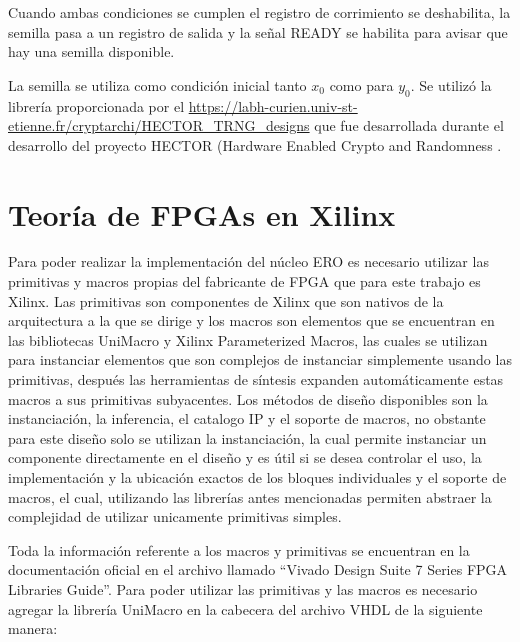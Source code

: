         Cuando ambas condiciones se cumplen el registro de corrimiento se deshabilita, la semilla pasa a un registro de salida y la señal READY se habilita para avisar que hay una semilla disponible.

        La semilla se utiliza como condición inicial tanto $x_{0}$ como para $y_{0}$. Se utilizó la librería proporcionada por el \url{https://labh-curien.univ-st-etienne.fr/cryptarchi/HECTOR_TRNG_designs} que fue desarrollada durante el desarrollo del proyecto HECTOR (Hardware Enabled Crypto and Randomness \cite{Laban2016}.

    \section{Teoría de FPGAs en Xilinx}
        Para poder realizar la implementación del núcleo ERO es necesario utilizar las primitivas y macros propias del fabricante de FPGA que para este trabajo es Xilinx. Las primitivas son componentes de Xilinx que son nativos de la arquitectura a la que se dirige y los macros son elementos que se encuentran en las bibliotecas UniMacro y Xilinx Parameterized Macros, las cuales se utilizan para instanciar elementos que son complejos de instanciar simplemente usando las primitivas, después las herramientas de síntesis expanden automáticamente estas macros a sus primitivas subyacentes. Los métodos de diseño disponibles son la instanciación, la inferencia, el catalogo IP y el soporte de macros, no obstante para este diseño solo se utilizan la instanciación, la cual permite instanciar un componente directamente en el diseño y es útil si se desea controlar el uso, la implementación y la ubicación exactos de los bloques individuales y el soporte de macros, el cual, utilizando las librerías antes mencionadas permiten abstraer la complejidad de utilizar unicamente primitivas simples.

        Toda la información referente a los macros y primitivas se encuentran en la documentación oficial en el archivo llamado ``Vivado Design Suite 7 Series FPGA Libraries Guide''. Para poder utilizar las primitivas y las macros es necesario agregar la librería UniMacro en la cabecera del archivo VHDL de la siguiente manera: 

        \vspace{0.4cm}
        

